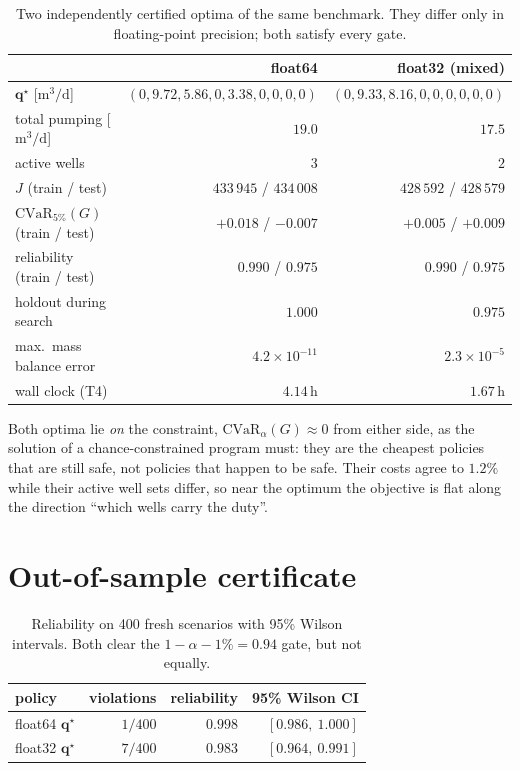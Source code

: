 \begin{table}[htbp]
\centering
\caption{Two independently certified optima of the same benchmark.  They differ
only in floating-point precision; both satisfy every gate.}
\label{tab:certified-policies}
\begin{tabular}{lrr}
\toprule
 & float64 & float32 (mixed) \\
\midrule
$\mathbf{q}^\star$ [$\mathrm{m^3/d}$] & $(0,9.72,5.86,0,3.38,0,0,0,0)$ & $(0,9.33,8.16,0,0,0,0,0,0)$ \\
total pumping [$\mathrm{m^3/d}$]      & $19.0$ & $17.5$ \\
active wells                          & $3$    & $2$ \\
$J$ (train / test)                    & $433\,945$ / $434\,008$ & $428\,592$ / $428\,579$ \\
$\mathrm{CVaR}_{5\%}(G)$ (train / test) & $+0.018$ / $-0.007$ & $+0.005$ / $+0.009$ \\
reliability (train / test)            & $0.990$ / $0.975$ & $0.990$ / $0.975$ \\
holdout during search                 & $1.000$ & $0.975$ \\
max.\ mass balance error              & $4.2\times10^{-11}$ & $2.3\times10^{-5}$ \\
wall clock (T4)                       & $4.14$\,h & $1.67$\,h \\
\bottomrule
\end{tabular}
\end{table}

Both optima lie \emph{on} the constraint, $\mathrm{CVaR}_\alpha(G)\approx 0$ from
either side, as the solution of a chance-constrained program must: they are the
cheapest policies that are still safe, not policies that happen to be safe.
Their costs agree to $1.2\%$ while their active well sets differ, so near the
optimum the objective is flat along the direction ``which wells carry the duty''.

\section{Out-of-sample certificate}

\begin{table}[htbp]
\centering
\caption{Reliability on 400 fresh scenarios with 95\% Wilson intervals.  Both
clear the $1-\alpha-1\%=0.94$ gate, but not equally.}
\label{tab:certificate}
\begin{tabular}{lrrr}
\toprule
policy & violations & reliability & 95\% Wilson CI \\
\midrule
float64 $\mathbf{q}^\star$ & $1/400$ & $0.998$ & $[0.986,\ 1.000]$ \\
float32 $\mathbf{q}^\star$ & $7/400$ & $0.983$ & $[0.964,\ 0.991]$ \\
\bottomrule
\end{tabular}
\end{table}

